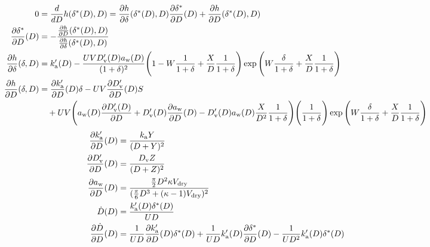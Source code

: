 \documentclass{article}
\begin{document}
\begin{align}
  0 &= \frac{d}{d D} h(\delta^*(D), D)
  = \frac{\partial h}{\partial \delta}(\delta^*(D), D)
  \frac{\partial \delta^*}{\partial D}(D)
  + \frac{\partial h}{\partial D}(\delta^*(D), D) \\
  \frac{\partial \delta^*}{\partial D}(D)
  &= - \frac{\frac{\partial h}{\partial D}(\delta^*(D), D)}{\frac{\partial h}{\partial \delta}(\delta^*(D), D)} \\
  \frac{\partial h}{\partial \delta}(\delta, D) &= k_{\rm a}'(D) -
  \frac{U V D_{\rm v}'(D) a_{\rm w}(D)}{(1 + \delta)^2} \Biggl( 1 - W \frac{1}{1+\delta}
  + \frac{X}{D} \frac{1}{1+\delta} \Biggr) \exp{\Biggl(W \frac{\delta}{1+\delta} +
      \frac{X}{D} \frac{1}{1+\delta}\Biggr)} \\
  \frac{\partial h}{\partial D}(\delta, D) &=
  \frac{\partial k_{\rm a}'}{\partial D}(D) \delta
  - U V \frac{\partial D_{\rm v}'}{\partial D}(D) S \nonumber \\
  &\quad + U V \Biggl( a_{\rm w}(D) \frac{\partial D_{\rm v}'(D)}{\partial D}+ D_{\rm v}'(D) \frac{\partial a_{\rm w}}{\partial D}(D)
  - D_{\rm v}'(D) a_{\rm w}(D) \frac{X}{D^2} \frac{1}{1 + \delta} \Biggr)
  \Biggl(\frac{1}{1+\delta}\Biggr)
  \exp{\Biggl(W \frac{\delta}{1+\delta} + \frac{X}{D} \frac{1}{1+\delta}\Biggr)}
\end{align}
\begin{align}
  \frac{\partial k_{\rm a}'}{\partial D}(D) &= \frac{k_{\rm a} Y}{(D+Y)^2} \\
  \frac{\partial D_{\rm v}'}{\partial D}(D) &= \frac{D_{\rm v} Z}{(D+Z)^2} \\
  \frac{\partial a_{\rm w}}{\partial D}(D) &= \frac{\frac{\pi}{2}D^2 \kappa V_{\rm dry}}{(\frac{\pi}{6}D^3 + (\kappa - 1) V_{\rm dry})^2} \\
  \dot{D}(D) &= \frac{k_{\rm a}'(D) \delta^*(D)}{U D} \\
  \frac{\partial \dot{D}}{\partial D}(D) &=
\frac{1}{U D} 
\frac{\partial k_{\rm a}'}{\partial D}(D) \delta^*(D)
+ \frac{1}{U D} k_{\rm a}'(D) \frac{\partial \delta^*}{\partial D}(D)
- \frac{1}{U D^2} k_{\rm a}'(D) \delta^*(D)
\end{align}

\end{document}
